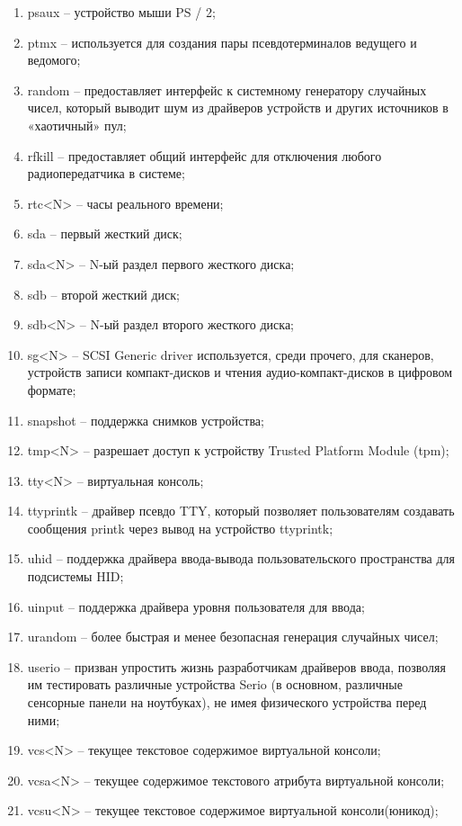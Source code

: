 \begin{enumerate}
    \item psaux -- устройство мыши PS / 2;
    \item ptmx -- используется для создания пары псевдотерминалов ведущего и ведомого;
    \item random -- предоставляет интерфейс к системному генератору случайных чисел, который выводит шум из драйверов устройств и других источников в «хаотичный» пул;
    \item rfkill -- предоставляет общий интерфейс для отключения любого радиопередатчика в системе;
    \item rtc<N> -- часы реального времени;
    \item sda -- первый жесткий диск;
    \item sda<N> -- N-ый раздел первого жесткого диска;
    \item sdb -- второй жесткий диск;
    \item sdb<N> -- N-ый раздел второго жесткого диска;
    \item sg<N> -- SCSI Generic driver используется, среди прочего, для сканеров, устройств записи компакт-дисков и чтения аудио-компакт-дисков в цифровом формате;
    \item snapshot -- поддержка снимков устройства;
    \item tmp<N> -- разрешает доступ к устройству Trusted Platform Module (tpm);
    \item tty<N> -- виртуальная консоль;
    \item ttyprintk -- драйвер псевдо TTY, который позволяет пользователям создавать сообщения printk через вывод на устройство ttyprintk;
    \item uhid -- поддержка драйвера ввода-вывода пользовательского пространства для подсистемы HID;
    \item uinput -- поддержка драйвера уровня пользователя для ввода;
    \item urandom -- более быстрая и менее безопасная генерация случайных чисел;
    \item userio -- призван упростить жизнь разработчикам драйверов ввода, позволяя им тестировать различные устройства Serio (в основном, различные сенсорные панели на ноутбуках), не имея физического устройства перед ними;
    \item vcs<N> -- текущее текстовое содержимое виртуальной консоли;
    \item vcsa<N> -- текущее содержимое текстового атрибута виртуальной консоли;
    \item vcsu<N> -- текущее текстовое содержимое виртуальной консоли(юникод);

\end{enumerate}
